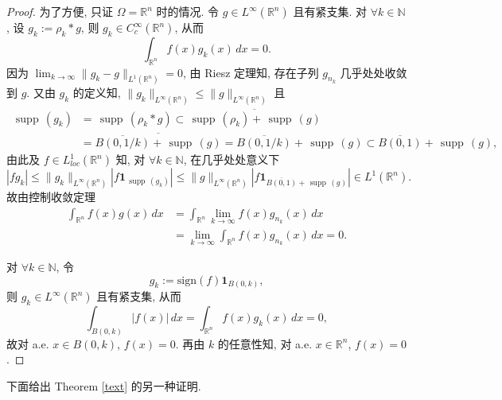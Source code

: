 \documentclass[a4paper,11pt]{article}
\theoremstyle{definition}
\def \supp {\mathop\mathrm{\,supp\,}}
\begin{document}
\begin{proof}
    为了方便, 只证 $ \Omega = \mathbb{R}^n $ 时的情况.
    令 $ g \in L^\infty(\mathbb{R}^n) $ 且有紧支集.
    对 $ \forall k \in \mathbb{N} $, 设 $ g_k := \rho_k * g $, 则 $ g_k \in C_c^\infty(\mathbb{R}^n) $,
    从而
    $$
        \int_{\mathbb{R}^n} f(x) g_k(x) \, dx = 0.
    $$
    因为 $ \lim_{k \to \infty} \| g_k - g \|_{L^1(\mathbb{R}^n)} = 0 $, 由 Riesz 定理知, 
    存在子列 $ g_{n_k} $ 几乎处处收敛到 $ g $. 又由 $ g_k $ 的定义知, 
    $ \|g_k\|_{L^\infty(\mathbb{R}^n)} \leq \|g\|_{L^\infty(\mathbb{R}^n)} $ 
    且 
    \begin{align*}
        \supp(g_k) &= \supp(\rho_k * g) 
                   \subset \overline{\supp(\rho_k) + \supp(g)} \\
                   &= \overline{\overline{B(0, 1/k)} + \supp(g)} 
                   = \overline{B(0, 1/k)} + \supp(g)
                   \subset \overline{B(0, 1)} + \supp(g), 
    \end{align*}
    由此及 $ f \in L^1_{loc}(\mathbb{R}^n) $ 知, 
    对 $ \forall k \in \mathbb{N} $, 在几乎处处意义下
    $$
        |f g_k| \leq \|g_k\|_{L^\infty(\mathbb{R}^n)} |f \mathbf{1}_{\supp(g_k)}|
                \leq \|g\|_{L^\infty(\mathbb{R}^n)} \left|f \mathbf{1}_{\overline{B(0, 1)} + \supp(g)}\right| 
                \in L^1(\mathbb{R}^n).
    $$
    故由控制收敛定理
    \begin{align*}
        \int_{\mathbb{R}^n} f(x) g(x) \, dx
            &= \int_{\mathbb{R}^n} \lim_{k \to \infty} f(x) g_{n_k}(x) \, dx \\
            &= \lim_{k \to \infty} \int_{\mathbb{R}^n} f(x) g_{n_k}(x) \, dx = 0.
    \end{align*}
    
    对 $ \forall k \in \mathbb{N} $, 令
    $$
        g_k := \mathrm{sign} (f) \mathbf{1}_{B(0, k)},
    $$
    则 $ g_k \in L^\infty(\mathbb{R}^n) $ 且有紧支集, 从而
    $$
        \int_{B(0, k)} |f(x)| \, dx
            = \int_{\mathbb{R}^n} f(x) g_k(x) \, dx
            = 0,
    $$
    故对 a.e. $ x \in B(0, k) $, $ f(x) = 0 $.
    再由 $ k $ 的任意性知, 对 a.e. $ x \in \mathbb{R}^n $, $ f(x) = 0 $.
\end{proof}

下面给出 Theorem \ref{text} 的另一种证明.
\end{document}
